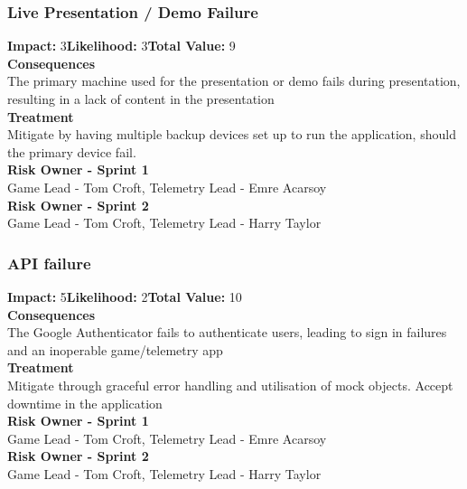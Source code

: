 \documentclass[11pt]{article}
\begin{document}
\subsubsection{Live Presentation / Demo Failure}
\textbf{Impact:} 3\quad \textbf{Likelihood:} 3\quad \textbf{Total Value:} 9\\
\textbf{Consequences}\\
The primary machine used for the presentation or demo fails during presentation, resulting in a lack of content in the presentation\\
\textbf{Treatment}\\
Mitigate by having multiple backup devices set up to run the application, should the primary device fail.\\
\textbf{Risk Owner - Sprint 1}\\
Game Lead - Tom Croft, Telemetry Lead - Emre Acarsoy\\
\textbf{Risk Owner - Sprint 2}\\
Game Lead - Tom Croft, Telemetry Lead - Harry Taylor
\subsubsection{API failure}
\textbf{Impact:} 5\quad \textbf{Likelihood:} 2\quad \textbf{Total Value:} 10\\
\textbf{Consequences}\\
The Google Authenticator fails to authenticate users, leading to sign in failures and an inoperable game/telemetry app\\
\textbf{Treatment}\\
Mitigate through graceful error handling and utilisation of mock objects. Accept downtime in the application\\
\textbf{Risk Owner - Sprint 1}\\
Game Lead - Tom Croft, Telemetry Lead - Emre Acarsoy\\
\textbf{Risk Owner - Sprint 2}\\
Game Lead - Tom Croft, Telemetry Lead - Harry Taylor
\end{document}

